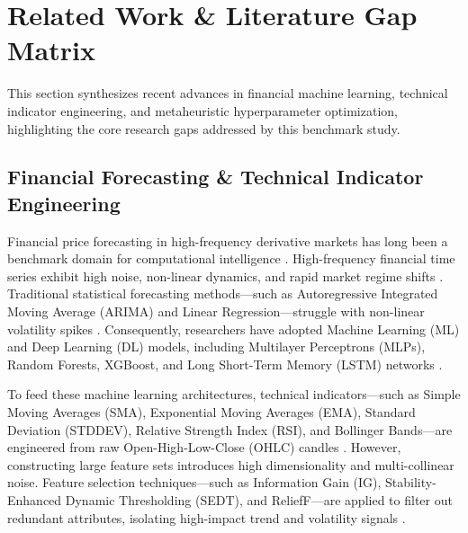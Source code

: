 
\section{Related Work \& Literature Gap Matrix}\label{sec:related_work}

This section synthesizes recent advances in financial machine learning, technical indicator engineering, and metaheuristic hyperparameter optimization, highlighting the core research gaps addressed by this benchmark study.

\subsection{Financial Forecasting \& Technical Indicator Engineering}\label{sec:rel_financial}

Financial price forecasting in high-frequency derivative markets has long been a benchmark domain for computational intelligence \cite{billah2024nca_moving_average, bashir2026evobagnet}. High-frequency financial time series exhibit high noise, non-linear dynamics, and rapid market regime shifts \cite{cardoso2022bovdb}. Traditional statistical forecasting methods—such as Autoregressive Integrated Moving Average (ARIMA) and Linear Regression—struggle with non-linear volatility spikes \cite{henrique2019stock_review}. Consequently, researchers have adopted Machine Learning (ML) and Deep Learning (DL) models, including Multilayer Perceptrons (MLPs), Random Forests, XGBoost, and Long Short-Term Memory (LSTM) networks \cite{ecer2020mlp_ga_pso, sekhar2025stock}.

To feed these machine learning architectures, technical indicators—such as Simple Moving Averages (SMA), Exponential Moving Averages (EMA), Standard Deviation (STDDEV), Relative Strength Index (RSI), and Bollinger Bands—are engineered from raw Open-High-Low-Close (OHLC) candles \cite{bollinger1992using, rahim2025technical}. However, constructing large feature sets introduces high dimensionality and multi-collinear noise. Feature selection techniques—such as Information Gain (IG), Stability-Enhanced Dynamic Thresholding (SEDT), and ReliefF—are applied to filter out redundant attributes, isolating high-impact trend and volatility signals \cite{souza2025iccsa, mutinda2026hybrid}.


